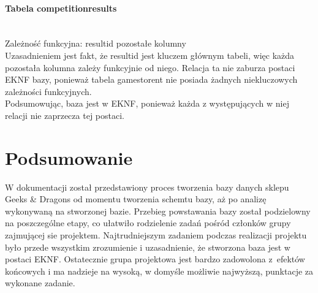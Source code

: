 \documentclass{article}
\begin{document}
	\paragraph{Tabela competition\textunderscore results}\mbox{}\vspace{0.2cm} \\
	Zależność funkcyjna: result\textunderscore id\mbox{} \textrightarrow \mbox{} pozostałe kolumny \vspace{0.2cm} \\
	\noindent Uzasadnieniem jest fakt, że result\textunderscore id jest kluczem głównym tabeli, więc każda pozostała kolumna zależy funkcyjnie od niego. Relacja ta nie zaburza postaci EKNF bazy, ponieważ tabela games\textunderscore to\textunderscore rent nie posiada żadnych niekluczowych zależności funkcyjnych.\\
	
	\noindent Podsumowując, baza jest w EKNF, ponieważ każda z występujących w niej relacji nie zaprzecza tej postaci.
	
	\section{Podsumowanie}
	W dokumentacji został przedstawiony proces tworzenia bazy danych sklepu Geeks \& Dragons od momentu tworzenia schemtu bazy, aż po analizę wykonywaną na stworzonej bazie. Przebieg powstawania bazy został podzielowny na poszczególne etapy, co ułatwiło rodzielenie zadań pośród członków grupy zajmującej sie projektem. Najtrudniejszym zadaniem podczas realizacji projektu było przede wszystkim zrozumienie i uzasadnienie, że stworzona baza jest w  postaci EKNF. Ostatecznie grupa projektowa jest bardzo zadowolona z~efektów końcowych i ma nadzieje na wysoką, w domyśle możliwie najwyższą, punktacje za wykonane zadanie.
	
\end{document}
